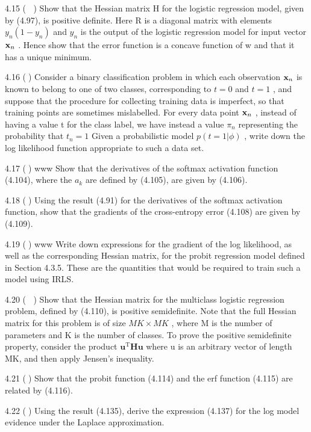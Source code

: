 \documentclass[
  10
]{article}
\begin{document}
4.15 ( ) Show that the Hessian matrix H for the logistic regression
model, given by (4.97), is positive definite. Here R is a diagonal
matrix with elements \(y _ { n } ( 1 - y _ { n } )\) and \(y _ { n }\)
is the output of the logistic regression model for input vector
\({ \bf x } _ { n }\) . Hence show that the error function is a concave
function of w and that it has a unique minimum.

4.16 () Consider a binary classification problem in which each
observation \({ \bf x } _ { n }\) is known to belong to one of two
classes, corresponding to \(t = 0\) and \(t = 1\) , and suppose that the
procedure for collecting training data is imperfect, so that training
points are sometimes mislabelled. For every data point
\({ \bf x } _ { n }\) , instead of having a value t for the class label,
we have instead a value \(\pi _ { n }\) representing the probability
that \(t _ { n } = 1\) Given a probabilistic model
\(p ( t = 1 | \phi )\) , write down the log likelihood function
appropriate to such a data set.

4.17 () www Show that the derivatives of the softmax activation function
(4.104), where the \(a _ { k }\) are defined by (4.105), are given by
(4.106).

4.18 () Using the result (4.91) for the derivatives of the softmax
activation function, show that the gradients of the cross-entropy error
(4.108) are given by (4.109).

4.19 () www Write down expressions for the gradient of the log
likelihood, as well as the corresponding Hessian matrix, for the probit
regression model defined in Section 4.3.5. These are the quantities that
would be required to train such a model using IRLS.

4.20 ( ) Show that the Hessian matrix for the multiclass logistic
regression problem, defined by (4.110), is positive semidefinite. Note
that the full Hessian matrix for this problem is of size
\(M K \times M K\) , where M is the number of parameters and K is the
number of classes. To prove the positive semidefinite property, consider
the product
\(\mathbf { u } ^ { \mathrm { T } } \mathbf { H } \mathbf { u }\) where
u is an arbitrary vector of length MK, and then apply Jensen's
inequality.

4.21 () Show that the probit function (4.114) and the erf function
(4.115) are related by (4.116).

4.22 () Using the result (4.135), derive the expression (4.137) for the
log model evidence under the Laplace approximation.
\end{document}
